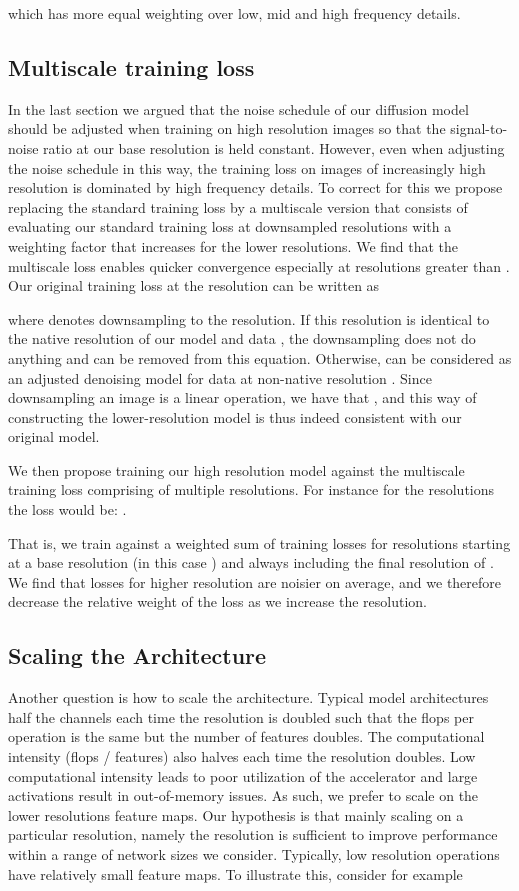 \documentclass[nohyperref]{article}
\theoremstyle{plain}
\theoremstyle{definition}
\theoremstyle{remark}
\begin{document}
which has more equal weighting over low, mid and high frequency details.

\subsection{Multiscale training loss}
In the last section we argued that the noise schedule of our diffusion model should be adjusted when training on high resolution images so that the signal-to-noise ratio at our base resolution is held constant. However, even when adjusting the noise schedule in this way, the training loss on images of increasingly high resolution is dominated by high frequency details. To correct for this we propose replacing the standard training loss by a multiscale version that consists of evaluating our standard training loss at downsampled resolutions with a weighting factor that increases for the lower resolutions. We find that the multiscale loss enables quicker convergence especially at resolutions greater than . Our original training loss at the  resolution can be written as 

where  denotes downsampling to the  resolution. If this resolution is identical to the native resolution of our model  and data , the downsampling does not do anything and can be removed from this equation. Otherwise,  can be considered as an adjusted denoising model for data at non-native resolution . Since downsampling an image is a linear operation, we have that , and this way of constructing the lower-resolution model is thus indeed consistent with our original model.

We then propose training our high resolution model against the multiscale training loss comprising of multiple resolutions. For instance for the resolutions  the loss would be: 
.

That is, we train against a weighted sum of training losses for resolutions starting at a base resolution (in this case ) and always including the final resolution of . We find that losses for higher resolution are noisier on average, and we therefore decrease the relative weight of the loss as we increase the resolution.


\subsection{Scaling the Architecture}
Another question is how to scale the architecture. Typical model architectures half the channels each time the resolution is doubled such that the flops per operation is the same but the number of features doubles. The computational intensity (flops / features) also halves each time the resolution doubles. Low computational intensity leads to poor utilization of the accelerator and large activations result in out-of-memory issues. As such, we prefer to scale on the lower resolutions feature maps. Our hypothesis is that mainly scaling on a particular resolution, namely the  resolution is sufficient to improve performance within a range of network sizes we consider. Typically, low resolution operations have relatively small feature maps. To illustrate this, consider for example
\end{document}
